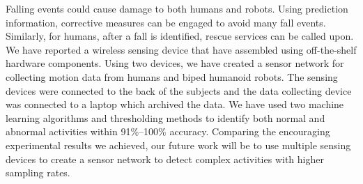 \documentclass[letterpaper]{article}
\begin{document}
\begin{sloppy}
Falling events could cause damage to both humans and robots.  Using prediction information, 
corrective measures can be engaged to avoid 
 many fall events. Similarly, for humans, after  a fall is identified, rescue services 
 can be called upon. We have reported a wireless sensing device that have assembled using 
off-the-shelf hardware components. Using two devices, we have created a sensor network for 
collecting motion data from humans and biped humanoid robots. The sensing devices were connected to 
the back of the subjects and the data collecting device was connected to a laptop which archived 
the data. We have used two machine learning algorithms and thresholding methods to 
identify both normal and abnormal activities within 91\%--100\% accuracy. Comparing the encouraging 
experimental results we achieved, our future work will be to use multiple sensing devices to create 
a sensor network to detect complex activities with higher sampling rates.  




\end{sloppy}
\end{document}

